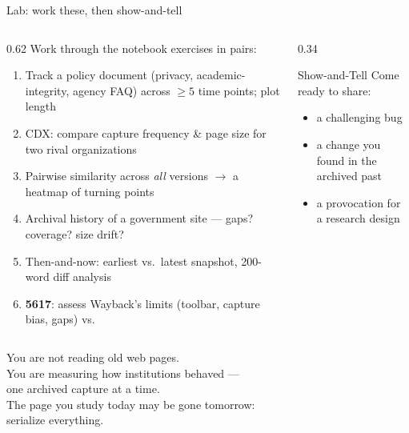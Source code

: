 \documentclass[9pt,aspectratio=169]{beamer}
\begin{document}
\begin{frame}{Lab: work these, then show-and-tell}
    \begin{columns}[T]
        \begin{column}{0.62\textwidth}
            Work through the notebook exercises in pairs:
            \begin{enumerate}\small
                \item Track a policy document (privacy, academic-integrity, agency FAQ) across $\geq 5$ time points; plot length
                \item CDX: compare capture frequency \& page size for two rival organizations
                \item Pairwise similarity across \textit{all} versions $\rightarrow$ a heatmap of turning points
                \item Archival history of a government site --- gaps? coverage? size drift?
                \item Then-and-now: earliest vs.\ latest snapshot, 200-word diff analysis
                \item[6.] \textcolor{tab-purple}{\textbf{5617}}: assess Wayback's limits (toolbar, capture bias, gaps) vs.\ \textcite{rogers2019doing}
            \end{enumerate}
        \end{column}
        \begin{column}{0.34\textwidth}
            \begin{block}{Show-and-Tell}
                \footnotesize Come ready to share:
                \begin{itemize}\footnotesize
                    \item a challenging bug
                    \item a change you found in the archived past
                    \item a provocation for a research design
                \end{itemize}
            \end{block}
        \end{column}
    \end{columns}
\end{frame}

\begin{frame}[standout]
    You are not reading old web pages.\\
    You are measuring how institutions behaved ---\\
    one archived capture at a time.\\[1em]
    {\large The page you study today may be gone tomorrow:\\ serialize everything.}
\end{frame}
\end{document}
